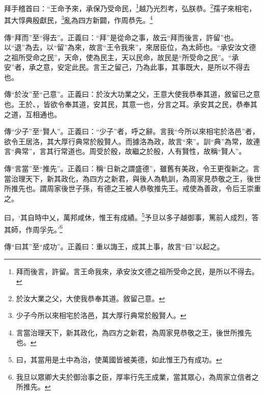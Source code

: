 拜手稽首曰：“王命予來，承保乃受命民，\footnote{拜而後言，許留。言王命我來，承安汝文德之祖所受命之民，是所以不得去。}越乃光烈考，弘朕恭。\footnote{於汝大業之父，大使我恭奉其道。敘留己意。}孺子來相宅，其大惇典殷獻民，\footnote{少子今所以來相宅於洛邑，其大厚行典常於殷賢人。}亂為四方新闢，作周恭先。\footnote{言當治理天下，新其政化，為四方之新君，為周家見恭敬之王，後世所推先也。}


{\noindent\zhuan{}\fzbyks 傳“拜而”至“得去”。正義曰：“拜”是從命之事，故云“拜而後言，許留”也。以“退”為去，以“留”為來，故言“王令我來”，來居臣位，為太師也。“承安汝文德之祖所受命之民”，天命，使為民主，天以民命，故民是“所受命之民”。“承安”者，承之意，安定此民。言王之留己，乃為此事，其事既大，是所以不得去也。 \par}

{\noindent\zhuan{}\fzbyks 傳“於汝”至“己意”。正義曰：於汝大功業之父，王意大使我恭奉其道，敘留已之意也。王於、，皆欲令奉其道，安其民，其意一也，分言之耳。承安其之民，恭奉其之道，互相通也。 \par}

{\noindent\zhuan{}\fzbyks 傳“少子”至“賢人”。正義曰：“少子”者，呼之辭。言我“今所以來相宅於洛邑”者，欲令王居洛，其大厚行典常於殷賢人。而據洛為政，故言“來”。訓“典”為常，故連言“典常”，言其行常道也。周受於殷，故繼之於殷，人有賢性，故稱“賢人”。 \par}

{\noindent\zhuan{}\fzbyks 傳“言當”至“推先”。正義曰：稱“日新之謂盛德”，雖舊有美政，令王更復新之。言當治理天下，新其政化，為四方之新君，與後人為軌訓，為周家見恭敬之王，後世所推先也。謂周家後世子孫，有德之王被人恭敬推先王。戒使為善政，令后王崇重之。 \par}

曰，‘其自時中乂，萬邦咸休，惟王有成績。\footnote{曰，其當用是土中為治，使萬國皆被美德，如此惟王乃有成功。}予旦以多子越御事，篤前人成烈，答其師，作周孚先。’\footnote{我旦以眾卿大夫於御治事之臣，厚率行先王成業，當其眾心，為周家立信者之所推先。}

{\noindent\zhuan{}\fzbyks 傳“曰其”至“成功”。正義曰：重以誨王，成其上事，故言“曰”以起之。 \par}

